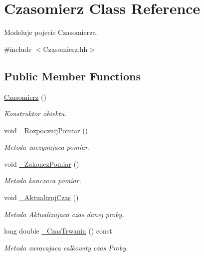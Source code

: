 \hypertarget{class_czasomierz}{\section{Czasomierz Class Reference}
\label{class_czasomierz}
}


Modeluje pojecie Czasomierza.  




{\ttfamily \#include $<$Czasomierz.\-hh$>$}

\subsection*{Public Member Functions}
\begin{DoxyCompactItemize}
\item 
\hyperlink{class_czasomierz_aa49ccbbc365ff5e54b41f4ec4d769038}{Czasomierz} ()
\begin{DoxyCompactList}\small\item\em Konstruktor obiektu. \end{DoxyCompactList}\item 
void \hyperlink{class_czasomierz_a26f594c73a3b382d1695f14a5682ca7c}{\-\_\-\-Rozpocznij\-Pomiar} ()
\begin{DoxyCompactList}\small\item\em Metoda zaczynajaca pomiar. \end{DoxyCompactList}\item 
void \hyperlink{class_czasomierz_a91e1a8e33b5e1eb7a5036eed57fb13a3}{\-\_\-\-Zakoncz\-Pomiar} ()
\begin{DoxyCompactList}\small\item\em Metoda konczaca pomiar. \end{DoxyCompactList}\item 
void \hyperlink{class_czasomierz_aecc4b89376b85367ab0e44fecb4ca6df}{\-\_\-\-Aktualizuj\-Czas} ()
\begin{DoxyCompactList}\small\item\em Metoda Aktualizujaca czas danej proby. \end{DoxyCompactList}\item 
long double \hyperlink{class_czasomierz_a80be3a3d837f8ca28e1a6bc2f231f0d7}{\-\_\-\-Czas\-Trwania} () const 
\begin{DoxyCompactList}\small\item\em Metoda zwracajaca calkowity czas Proby. \end{DoxyCompactList}\item 

\end{DoxyCompactItemize}
